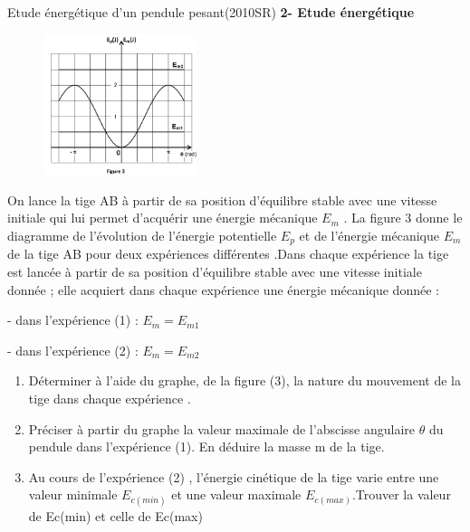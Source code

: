 \documentclass[12pt]{article}
\begin{document}
\begin{Box2}{Etude énergétique d’un pendule pesant(2010SR)}
  \textbf{2- Etude énergétique}

	\begin{figure}
		\begin{center}
			\vspace{-2cm}
			\includegraphics[width=0.4\textwidth]{./img/PenduleP01.png}
		\end{center}
	\end{figure}

  On lance la tige AB à partir de sa position d’équilibre stable avec une vitesse initiale qui lui permet
d’acquérir une énergie mécanique $E_m$ .
La figure 3 donne le diagramme de l’évolution de l’énergie potentielle $E_p$ et de l’énergie mécanique $E_m$
de la tige AB pour deux expériences différentes .Dans chaque expérience la tige est lancée à partir de sa
position d’équilibre stable avec une vitesse initiale donnée ; elle acquiert dans chaque expérience une
énergie mécanique donnée :

  - dans l’expérience (1) : $E_m=E_{m1}$

  - dans l’expérience (2) : $E_m=E_{m2}$

\begin{enumerate}
    \item Déterminer à l’aide du graphe,
de la figure (3), la nature du mouvement
de la tige dans chaque expérience .

  \item Préciser à partir du graphe la valeur
maximale de l’abscisse angulaire $\theta$
du pendule dans l’expérience (1).
En déduire la masse m de la tige.
  
  \item Au cours de l’expérience (2) , l’énergie
cinétique de la tige varie entre une valeur
      minimale $E_{c(min)}$ et une valeur
      maximale $E_{c(max)}$.Trouver la valeur de Ec(min) et celle de Ec(max)
\end{enumerate}

\end{Box2}
\end{document}
